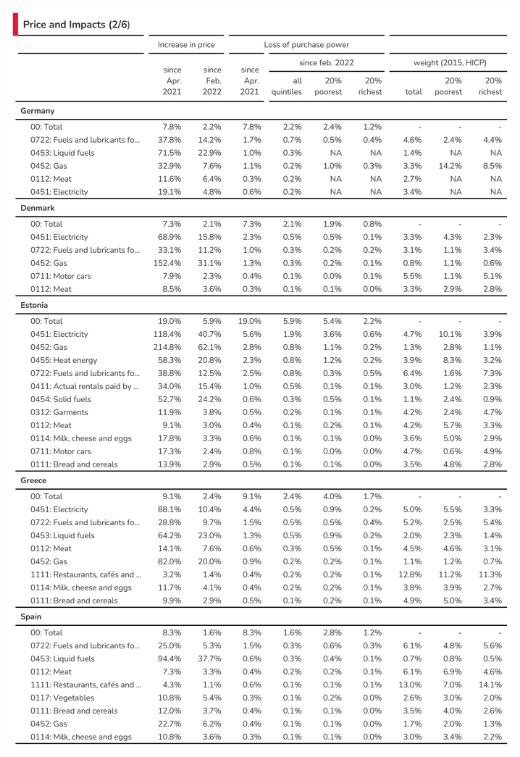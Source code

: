 \documentclass[
  9pt,
  a4paper,
  DIV=11,
  numbers=noendperiod]{scrartcl}
\begin{document}
\includegraphics[width=17cm,height=\textheight]{../svg/annex_2.png}
\end{document}
